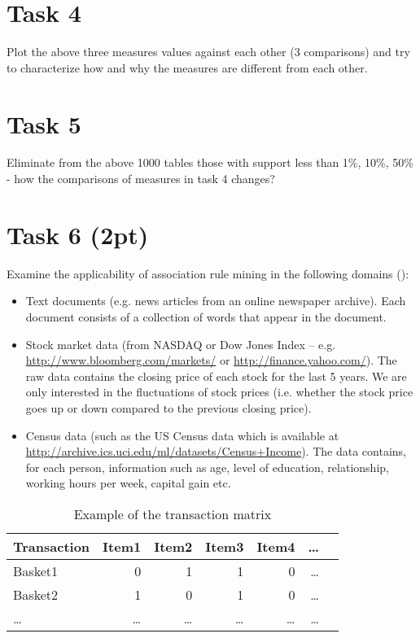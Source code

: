 \documentclass{article}
\begin{document}
\section*{Task 4}
Plot the above three measures values against each other (3 comparisons) and try to characterize how and why the measures are different from each other.
 
\section*{Task 5}
Eliminate from the above 1000 tables those with support less than 1\%, 10\%, 50\% - how the comparisons of measures in task 4 changes?

\section*{Task 6 (2pt)}
Examine the applicability of association rule mining in the following domains (\cite{Kumar2000}):
\begin{itemize}
\item Text documents (e.g. news articles from an online newspaper archive). Each document 
consists of a collection of words that appear in the document.
\item Stock market data (from NASDAQ or Dow Jones Index – e.g. \url{http://www.bloomberg.com/markets/} or \url{http://finance.yahoo.com/}). The raw data contains the closing price of each stock for the last 5 years. We are only interested in the fluctuations of stock prices (i.e. whether the stock price goes up or down compared to the previous closing price).
\item Census data (such as the US Census data which is available at 
\url{http://archive.ics.uci.edu/ml/datasets/Census+Income}). The data contains, for each person, 
information such as age, level of education, relationship, working hours per week, capital gain etc. 
\end{itemize} 
\begin{table}[h!]
\begin{center}
\begin{tabular}{l*{6}r}
\hline
Transaction& Item1& Item2& Item3& Item4& \dots\\
\hline
Basket1& 0& 1& 1& 0& \dots \\
Basket2& 1& 0& 1& 0& \dots \\
\dots&\dots& \dots&\dots& \dots& \dots\\ 
\end{tabular}
\end{center}
\caption{Example of the transaction matrix}
\label{tab:trans_matrix}
\end{table}
 
\end{document}

